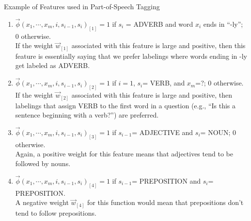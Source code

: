 \documentclass[handout]{beamer}
\begin{document}
\begin{frame}{Example of Features used in Part-of-Speech Tagging}
\begin{scriptsize}


\begin{enumerate}
 \item $\vec{\phi}(x_1, \cdots, x_m, i, s_{i-1},s_i)_{[1]}=1$ if $s_i$ = ADVERB and word $x_i$ ends in ``-ly''; 0 otherwise. \\ 
 
 If the weight $\vec{w}_{[1]}$ associated with this feature is large and positive, then this feature is essentially saying that we prefer labelings where words ending in -ly get labeled as ADVERB.
 
 \item $\vec{\phi}(x_1, \cdots, x_m, i, s_{i-1},s_i)_{[2]}=1$ if $i=1$, $s_i$= VERB, and $x_m$=?; 0 otherwise. 
 \\ If the weight $\vec{w}_{[2]}$ associated with this feature is large and positive, then labelings that assign VERB to the first word in a question (e.g., ``Is this a sentence beginning with a verb?'') are preferred.


\item $\vec{\phi}(x_1, \cdots, x_m, i, s_{i-1},s_i)_{[3]}=1$ if $s_{i-1}$= ADJECTIVE and $s_i$= NOUN; 0 otherwise. 
\\Again, a positive weight for this feature means that adjectives tend to be followed by nouns. 

\item $\vec{\phi}(x_1, \cdots, x_m, i, s_{i-1},s_i)_{[4]}=1$ if $s_{i-1}$= PREPOSITION and $s_{i}$= PREPOSITION. 
\\ A negative weight $\vec{w}_{[4]}$ for this function would mean that prepositions don't tend to follow prepositions.

 
\end{enumerate}



\end{scriptsize}
\end{frame}
\end{document}
